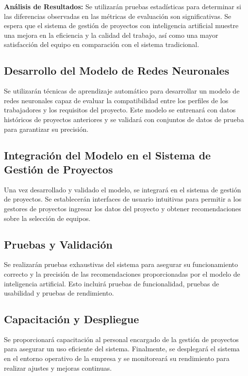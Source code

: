 \documentclass{article}
\begin{document}
        \textbf{Análisis de Resultados:}
        Se utilizarán pruebas estadísticas para determinar si las diferencias observadas en las métricas de evaluación son significativas. Se espera que el sistema de gestión de proyectos con inteligencia artificial muestre una mejora en la eficiencia y la calidad del trabajo, así como una mayor satisfacción del equipo en comparación con el sistema tradicional.

    \subsection{Desarrollo del Modelo de Redes Neuronales}
    Se utilizarán técnicas de aprendizaje automático para desarrollar un modelo de redes neuronales capaz de evaluar la compatibilidad entre los perfiles de los trabajadores y los requisitos del proyecto. Este modelo se entrenará con datos históricos de proyectos anteriores y se validará con conjuntos de datos de prueba para garantizar su precisión.

    \subsection{Integración del Modelo en el Sistema de Gestión de Proyectos}
    Una vez desarrollado y validado el modelo, se integrará en el sistema de gestión de proyectos. Se establecerán interfaces de usuario intuitivas para permitir a los gestores de proyectos ingresar los datos del proyecto y obtener recomendaciones sobre la selección de equipos.

    \subsection{Pruebas y Validación}
    Se realizarán pruebas exhaustivas del sistema para asegurar su funcionamiento correcto y la precisión de las recomendaciones proporcionadas por el modelo de inteligencia artificial. Esto incluirá pruebas de funcionalidad, pruebas de usabilidad y pruebas de rendimiento.

    \subsection{Capacitación y Despliegue}
    Se proporcionará capacitación al personal encargado de la gestión de proyectos para asegurar un uso eficiente del sistema. Finalmente, se desplegará el sistema en el entorno operativo de la empresa y se monitoreará su rendimiento para realizar ajustes y mejoras continuas.
\end{document}
